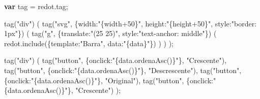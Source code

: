 \documentclass[]{article}
\newenvironment{Shaded}{}{}
\newcommand{\KeywordTok}[1]{\textcolor[rgb]{0.00,0.44,0.13}{\textbf{{#1}}}}
\newcommand{\DataTypeTok}[1]{\textcolor[rgb]{0.56,0.13,0.00}{{#1}}}
\newcommand{\StringTok}[1]{\textcolor[rgb]{0.25,0.44,0.63}{{#1}}}
\newcommand{\VariableTok}[1]{\textcolor[rgb]{0.10,0.09,0.49}{{#1}}}
\newcommand{\OperatorTok}[1]{\textcolor[rgb]{0.40,0.40,0.40}{{#1}}}
\newcommand{\AttributeTok}[1]{\textcolor[rgb]{0.49,0.56,0.16}{{#1}}}
\newcommand{\NormalTok}[1]{{#1}}
\begin{document}
\begin{Shaded}
\begin{Highlighting}[]
\KeywordTok{var} \NormalTok{tag }\OperatorTok{=} \VariableTok{redot}\NormalTok{.}\AttributeTok{tag}\OperatorTok{;}

\AttributeTok{tag}\NormalTok{(}\StringTok{"div"}\NormalTok{) }
\NormalTok{(}
    \AttributeTok{tag}\NormalTok{(}\StringTok{"svg"}\OperatorTok{,} \OperatorTok{\{}\DataTypeTok{width}\OperatorTok{:}\StringTok{"\{width+50\}"}\OperatorTok{,} \DataTypeTok{height}\OperatorTok{:}\StringTok{"\{height+50\}"}\OperatorTok{,} \DataTypeTok{style}\OperatorTok{:}\StringTok{"border: 1px"}\OperatorTok{\}}\NormalTok{) }
    \NormalTok{(}
        \AttributeTok{tag}\NormalTok{(}\StringTok{"g"}\OperatorTok{,} \OperatorTok{\{}\DataTypeTok{translate}\OperatorTok{:}\StringTok{"(25 25)"}\OperatorTok{,} \DataTypeTok{style}\OperatorTok{:}\StringTok{"text-anchor: middle"}\OperatorTok{\}}\NormalTok{) }
        \NormalTok{(}
            \VariableTok{redot}\NormalTok{.}\AttributeTok{include}\NormalTok{(}\OperatorTok{\{}\DataTypeTok{template}\OperatorTok{:}\StringTok{"Barra"}\OperatorTok{,} \DataTypeTok{data}\OperatorTok{:}\StringTok{"\{data\}"}\OperatorTok{\}}\NormalTok{)}
        \NormalTok{)}
    \NormalTok{)}
\NormalTok{)}\OperatorTok{;}

\AttributeTok{tag}\NormalTok{(}\StringTok{"div"}\NormalTok{) }
\NormalTok{(}
    \AttributeTok{tag}\NormalTok{(}\StringTok{"button"}\OperatorTok{,} \OperatorTok{\{}\DataTypeTok{onclick}\OperatorTok{:}\StringTok{"\{data.ordenaAsc()\}"}\OperatorTok{\},} \StringTok{"Crescente"}\NormalTok{)}\OperatorTok{,}
    \AttributeTok{tag}\NormalTok{(}\StringTok{"button"}\OperatorTok{,} \OperatorTok{\{}\DataTypeTok{onclick}\OperatorTok{:}\StringTok{"\{data.ordenaAsc()\}"}\OperatorTok{\},} \StringTok{"Descrescente"}\NormalTok{)}\OperatorTok{,}
    \AttributeTok{tag}\NormalTok{(}\StringTok{"button"}\OperatorTok{,} \OperatorTok{\{}\DataTypeTok{onclick}\OperatorTok{:}\StringTok{"\{data.ordenaAsc()\}"}\OperatorTok{\},} \StringTok{"Original"}\NormalTok{)}\OperatorTok{,}
    \AttributeTok{tag}\NormalTok{(}\StringTok{"button"}\OperatorTok{,} \OperatorTok{\{}\DataTypeTok{onclick}\OperatorTok{:}\StringTok{"\{data.ordenaAsc()\}"}\OperatorTok{\},} \StringTok{"Crescente"}\NormalTok{)}
\NormalTok{)}\OperatorTok{;}
\end{Highlighting}
\end{Shaded}
\end{document}
